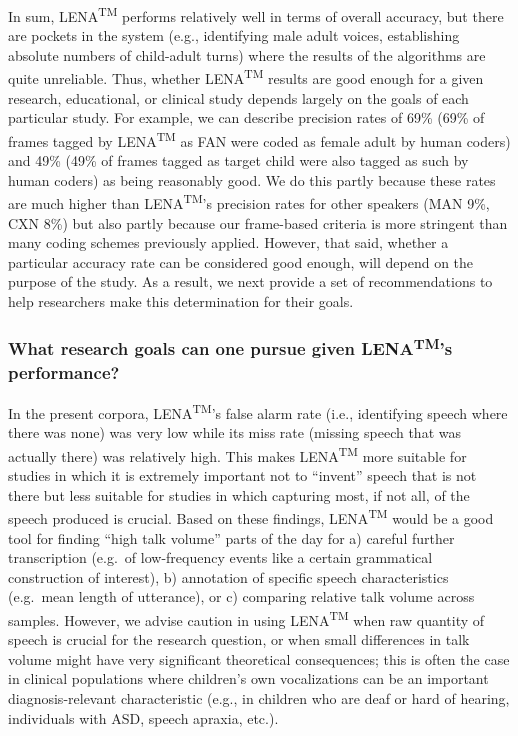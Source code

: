 \documentclass[english,table,man,floatsintext]{apa6}
\begin{document}
In sum, LENA\textsuperscript{TM} performs relatively well in terms of overall accuracy, but there are pockets in the system (e.g., identifying male adult voices, establishing absolute numbers of child-adult turns) where the results of the algorithms are quite unreliable. Thus, whether LENA\textsuperscript{TM} results are good enough for a given research, educational, or clinical study depends largely on the goals of each particular study. For example, we can describe precision rates of 69\% (69\% of frames tagged by LENA\textsuperscript{TM} as FAN were coded as female adult by human coders) and 49\% (49\% of frames tagged as target child were also tagged as such by human coders) as being reasonably good. We do this partly because these rates are much higher than LENA\textsuperscript{TM}'s precision rates for other speakers (MAN 9\%, CXN 8\%) but also partly because our frame-based criteria is more stringent than many coding schemes previously applied. However, that said, whether a particular accuracy rate can be considered good enough, will depend on the purpose of the study. As a result, we next provide a set of recommendations to help researchers make this determination for their goals.

\hypertarget{what-research-goals-can-one-pursue-given-lenatms-performance}{%
\subsubsection{\texorpdfstring{What research goals can one pursue given LENA\textsuperscript{TM}'s performance?}{What research goals can one pursue given LENATM's performance?}}\label{what-research-goals-can-one-pursue-given-lenatms-performance}}

In the present corpora, LENA\textsuperscript{TM}'s false alarm rate (i.e., identifying speech where there was none) was very low while its miss rate (missing speech that was actually there) was relatively high. This makes LENA\textsuperscript{TM} more suitable for studies in which it is extremely important not to \enquote{invent} speech that is not there but less suitable for studies in which capturing most, if not all, of the speech produced is crucial. Based on these findings, LENA\textsuperscript{TM} would be a good tool for finding \enquote{high talk volume} parts of the day for a) careful further transcription (e.g.~of low-frequency events like a certain grammatical construction of interest), b) annotation of specific speech characteristics (e.g.~mean length of utterance), or c) comparing relative talk volume across samples. However, we advise caution in using LENA\textsuperscript{TM} when raw quantity of speech is crucial for the research question, or when small differences in talk volume might have very significant theoretical consequences; this is often the case in clinical populations where children's own vocalizations can be an important diagnosis-relevant characteristic (e.g., in children who are deaf or hard of hearing, individuals with ASD, speech apraxia, etc.).
\end{document}
